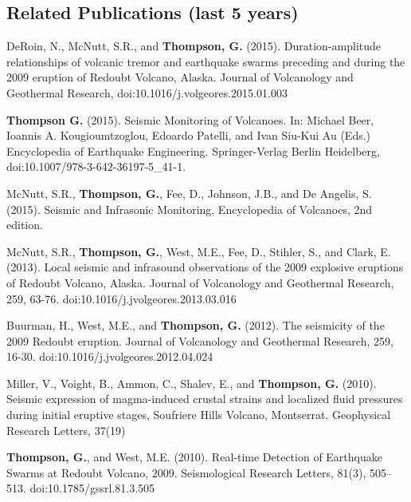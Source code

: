 \documentclass[margin,line]{res}
\begin{document}
\begin{resume}
\section{\sc Related Publications (last 5 years)}

	DeRoin, N., McNutt, S.R., and {\bf Thompson, G.} (2015). Duration-amplitude relationships of volcanic tremor and earthquake swarms preceding and during the 2009 eruption of Redoubt Volcano, Alaska. Journal of Volcanology and Geothermal Research, doi:10.1016/j.volgeores.2015.01.003
	
	{\bf Thompson G.} (2015). Seismic Monitoring of Volcanoes. In: Michael Beer, Ioannis A. Kougioumtzoglou, Edoardo Patelli, and Ivan Siu-Kui Au (Eds.) Encyclopedia of Earthquake Engineering. Springer-Verlag Berlin Heidelberg, doi:10.1007/978-3-642-36197-5\_41-1.
	
	McNutt, S.R., {\bf Thompson, G.}, Fee, D., Johnson, J.B., and De Angelis, S. (2015). Seismic and Infrasonic Monitoring, Encyclopedia of Volcanoes, 2nd edition.

	McNutt, S.R., {\bf Thompson, G.}, West, M.E., Fee, D., Stihler, S., and Clark, E. (2013). Local seismic and infrasound observations of the 2009 explosive eruptions of Redoubt Volcano, Alaska. Journal of Volcanology and Geothermal Research, 259, 63-76. doi:10.1016/j.jvolgeores.2013.03.016

	Buurman, H., West, M.E., and {\bf Thompson, G.} (2012). The seismicity of the 2009 Redoubt eruption. Journal of Volcanology and Geothermal Research, 259, 16-30. doi:10.1016/j.jvolgeores.2012.04.024

	Miller, V., Voight, B., Ammon, C., Shalev, E., and {\bf Thompson, G.} (2010). Seismic expression of magma-induced crustal strains and localized fluid pressures during initial eruptive stages, Soufriere Hills Volcano, Montserrat. Geophysical Research Letters, 37(19) 

	{\bf Thompson, G.}, and West, M.E. (2010). Real-time Detection of Earthquake Swarms at Redoubt Volcano, 2009. Seismological Research Letters, 81(3), 505–513. doi:10.1785/gssrl.81.3.505

\end{resume}
\end{document}
